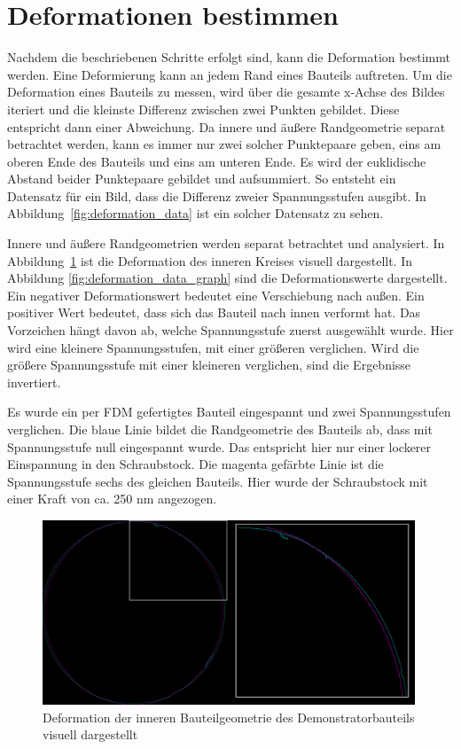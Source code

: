 \section{Deformationen bestimmen} \label{defoinfo}

Nachdem die beschriebenen Schritte erfolgt sind, kann die Deformation bestimmt werden.
Eine Deformierung kann an jedem Rand eines Bauteils auftreten.
Um die Deformation eines Bauteils zu messen, wird über die 
gesamte x-Achse des Bildes iteriert und die kleinste Differenz 
zwischen zwei Punkten gebildet. Diese entspricht dann einer Abweichung. 
Da innere und äußere Randgeometrie separat betrachtet werden, kann es immer nur zwei
solcher Punktepaare geben, eins am oberen Ende des Bauteils und eins am unteren Ende.
Es wird der euklidische Abstand beider Punktepaare gebildet und aufsummiert.
So entsteht ein Datensatz für ein Bild, 
dass die Differenz zweier Spannungsstufen ausgibt. In Abbildung~\ref{fig:deformation_data}
ist ein solcher Datensatz zu sehen. 

Innere und äußere Randgeometrien werden separat betrachtet und analysiert.
In Abbildung~\ref{fig:deformation_data_vis} ist die Deformation des inneren Kreises
visuell dargestellt. In Abbildung \ref{fig:deformation_data_graph} sind die 
Deformationswerte dargestellt. Ein negativer Deformationswert bedeutet eine 
Verschiebung nach außen. Ein positiver Wert bedeutet, dass sich das Bauteil nach 
innen verformt hat. Das Vorzeichen hängt davon ab, welche Spannungsstufe zuerst ausgewählt
wurde. Hier wird eine kleinere Spannungsstufen, mit einer größeren verglichen.
Wird die größere Spannungsstufe mit einer kleineren verglichen, sind die Ergebnisse
invertiert.

Es wurde ein per FDM gefertigtes Bauteil eingespannt und zwei Spannungsstufen verglichen.
Die blaue Linie bildet die Randgeometrie des Bauteils ab, dass mit Spannungsstufe
null eingespannt wurde. Das entspricht hier nur einer lockerer Einspannung in den 
Schraubstock. Die magenta gefärbte Linie ist die Spannungsstufe sechs des gleichen
Bauteils. Hier wurde der Schraubstock mit einer Kraft von ca. 250 nm angezogen.

\begin{figure}[H]
    \centering
    \includegraphics[width=0.99\textwidth]{images/FDM2_SP0_stitched_FDM2_SP4_stitched_1_1_cut.png}
    \caption{Deformation der inneren Bauteilgeometrie des Demonstratorbauteils 
    visuell dargestellt}
    \label{fig:deformation_data_vis}
\end{figure}

